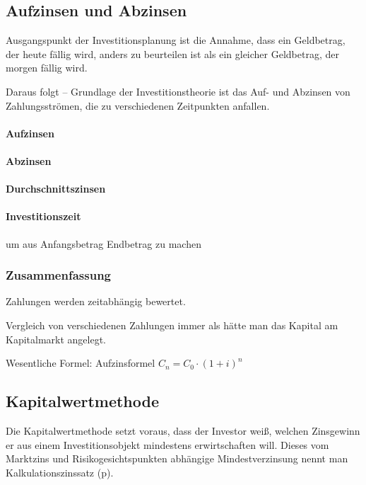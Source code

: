 \clearpage
\subsection{Aufzinsen und Abzinsen}
Ausgangspunkt der Investitionsplanung ist die Annahme, dass ein Geldbetrag, der {\flqq heute\frqq} fällig wird, anders zu beurteilen ist als ein gleicher Geldbetrag, der {\flqq morgen\frqq} fällig wird.

Daraus folgt -- Grundlage der Investitionstheorie ist das Auf- und Abzinsen von Zahlungsströmen, die zu verschiedenen Zeitpunkten anfallen.

\paragraph{Aufzinsen}

\paragraph{Abzinsen}

\paragraph{Durchschnittszinsen}

\paragraph{Investitionszeit} um aus Anfangsbetrag Endbetrag zu machen

\clearpage
\subsubsection{Zusammenfassung}
\begin{compactitem}
	\item Zahlungen werden zeitabhängig bewertet.
	\item Vergleich von verschiedenen Zahlungen immer als hätte man das Kapital am Kapitalmarkt angelegt.
	\item Wesentliche Formel: Aufzinsformel $C_n=C_0\cdot(1+i)^n$
\end{compactitem}

\subsection{Kapitalwertmethode}
Die Kapitalwertmethode setzt voraus, dass der Investor weiß, welchen {\flqq Zinsgewinn\frqq} er aus einem Investitionsobjekt mindestens erwirtschaften will. Dieses vom Marktzins und Risikogesichtspunkten abhängige Mindestverzinsung nennt man Kalkulationszinssatz (p).

